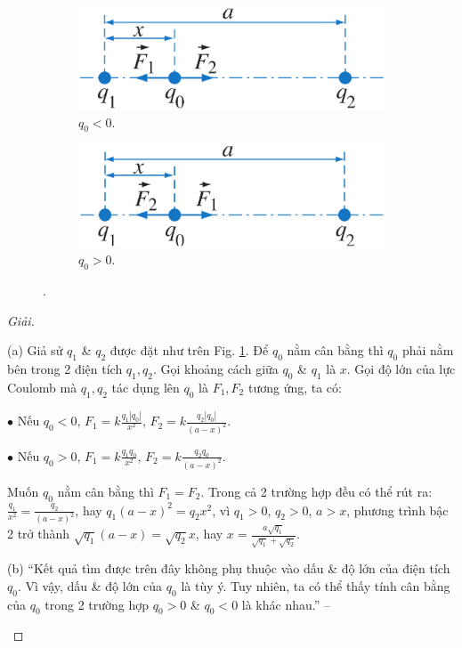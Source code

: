 \documentclass[oneside]{book}
\numberwithin{equation}{section}
\begin{document}
\begin{figure}[H]
	\centering
	\begin{subfigure}{.5\textwidth}
		\centering
		\includegraphics[width=.45\linewidth]{3_dien_tich_thang_hang_a}
		\caption{$q_0 < 0$.}
	\end{subfigure}%
	\begin{subfigure}{.5\textwidth}
		\centering
		\includegraphics[width=.45\linewidth]{3_dien_tich_thang_hang_b}
		\caption{$q_0 > 0$.}
	\end{subfigure}
	\caption{\cite[Hình 5.1, p. 5.1]{SGK_Vat_Ly_11_nang_cao}.}
	\label{fig:3_dien_tich_thang_hang}
\end{figure}

\begin{proof}[Giải]
	\begin{enumerate*}
		\item[(a)] Giả sử $q_1$ \& $q_2$ được đặt như trên Fig. \ref{fig:3_dien_tich_thang_hang}. Để $q_0$ nằm cân bằng thì $q_0$ phải nằm bên trong 2 điện tích $q_1,q_2$. Gọi khoảng cách giữa $q_0$ \& $q_1$ là $x$. Gọi độ lớn của lực Coulomb mà $q_1,q_2$ tác dụng lên $q_0$ là $F_1,F_2$ tương ứng, ta có:
		\begin{enumerate*}
			\item[$\bullet$] Nếu $q_0 < 0$, $F_1 = k\frac{q_1|q_0|}{x^2}$, $F_2 = k\frac{q_2|q_0|}{(a - x)^2}$.
			\item[$\bullet$] Nếu $q_0 > 0$, $F_1 = k\frac{q_1q_0}{x^2}$, $F_2 = k\frac{q_2q_0}{(a - x)^2}$.
		\end{enumerate*}
		Muốn $q_0$ nằm cân bằng thì $F_1 = F_2$. Trong cả 2 trường hợp đều có thể rút ra: $\frac{q_1}{x^2} = \frac{q_2}{(a - x)^2}$, hay $q_1(a - x)^2 = q_2x^2$, vì $q_1 > 0$, $q_2 > 0$, $a > x$, phương trình bậc 2 trở thành $\sqrt{q_1}(a - x) = \sqrt{q_2}x$, hay $x = \frac{a\sqrt{q_1}}{\sqrt{q_1} + \sqrt{q_2}}$.
		\item[(b)] ``Kết quả tìm được trên đây không phụ thuộc vào dấu \& độ lớn của điện tích $q_0$. Vì vậy, dấu \& độ lớn của $q_0$ là tùy ý. Tuy nhiên, ta có thể thấy tính cân bằng của $q_0$ trong 2 trường hợp $q_0 > 0$ \& $q_0 < 0$ là khác nhau.'' -- \cite[p. 25]{SGK_Vat_Ly_11_nang_cao}
	\end{enumerate*}
\end{proof}
\end{document}
